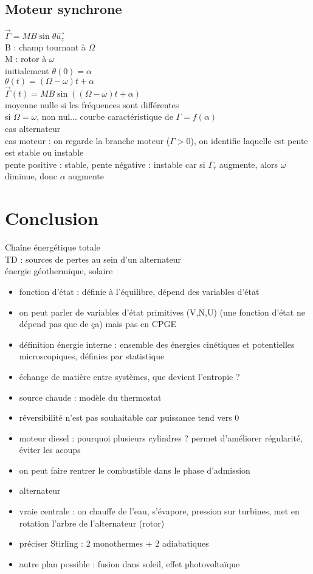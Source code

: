 \subsection{Moteur synchrone}
$\vec{\Gamma}=M B \sin \theta \vec{u_z}$ \\
B : champ tournant à $\Omega$ \\
M : rotor à $\omega$ \\
initialement $\theta(0)=\alpha$ \\
$\theta (t)=\left( \Omega -\omega \right) t + \alpha $ \\
$\vec{\Gamma} (t)= M B \sin \left( (\Omega-\omega)t+\alpha \right)$ \\
moyenne nulle si les fréquences sont différentes \\
si $\Omega=\omega$, non nul... courbe caractéristique de $\Gamma=f(\alpha)$  \\
cas alternateur \\
cas moteur : on regarde la branche moteur ($\Gamma >0$), on identifie laquelle est pente est stable ou instable \\
pente positive : stable, pente négative : instable
car si $\Gamma_r$ augmente, alors $\omega$ diminue, donc $\alpha$ augmente

\section*{Conclusion}
Chaîne énergétique totale \\
TD : sources de pertes au sein d'un alternateur \\
énergie géothermique, solaire \\


\begin{remarques} \begin{itemize} 
\item fonction d'état : définie à l'équilibre, dépend des variables d'état 
\item on peut parler de variables d'état primitives (V,N,U) (une fonction d'état ne dépend pas que de ça) mais pas en CPGE
\item définition énergie interne : ensemble des énergies cinétiques et potentielles microscopiques, définies par statistique
\item échange de matière entre systèmes, que devient l'entropie ? 
\item source chaude : modèle du thermostat
\item réversibilité n'est pas souhaitable car puissance tend vers 0
\item moteur diesel : pourquoi plusieurs cylindres ? permet d'améliorer régularité, éviter les acoups
\item on peut faire rentrer le combustible dans le phase d'admission
\item alternateur 
\item vraie centrale : on chauffe de l'eau, s'évapore, pression sur turbines, met en rotation l'arbre de l'alternateur (rotor)
\item préciser Stirling : 2 monothermes + 2 adiabatiques
\item autre plan possible : fusion dans soleil, effet photovoltaïque
\end{itemize} \end{remarques}
